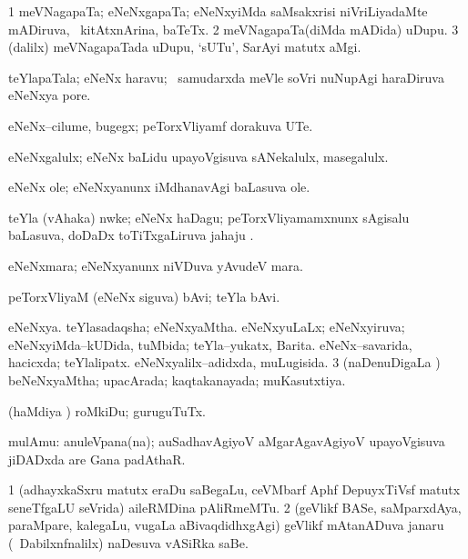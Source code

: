 \bentry
{}
\gl{\nA}
\bmng
\bnum
\num{1} meVNagapaTa; eNeNxgapaTa; eNeNxyiMda saMsakxrisi niVriLiyadaMte mADiruva, \kanmu\ kitAtxnArina, baTeTx. 
\num{2} meVNagapaTa(diMda mADida) uDupu. 
\num{3} (\bava dalilx) meVNagapaTada uDupu, `sUTu', SarAyi matutx aMgi. 
\enum
\emng
\eentry

\bentry
{}
\gl{\nA}
\bmng
teYlapaTala; eNeNx haravu; \kanmu\ samudarxda meVle soVri nuNupAgi haraDiruva eNeNxya pore. 
\emng
\eentry

\bentry
{}
\gl{\nA}
\bmng
eNeNx--cilume, bugegx; peTorxVliyamf dorakuva UTe. 
\emng
\eentry

\bentry
{}
\gl{\nA}
\bmng
eNeNxgalulx; eNeNx baLidu upayoVgisuva sANekalulx, masegalulx. 
\emng
\eentry

\bentry
{}
\gl{\nA}
\bmng
eNeNx ole; eNeNxyanunx iMdhanavAgi baLasuva ole. 
\emng
\eentry

\bentry
{}
\gl{\nA}
\bmng
teYla (vAhaka) nwke; eNeNx haDagu; peTorxVliyamamxnunx sAgisalu baLasuva, doDaDx toTiTxgaLiruva ja{ha}ju . 
\emng
\eentry

\bentry
{}
\gl{\nA}
\bmng
eNeNxmara; eNeNxyanunx niVDuva yAvudeV mara. 
\emng
\eentry

\bentry
{}
\gl{\nA}
\bmng
peTorxVliyaM (eNeNx siguva) bAvi; teYla bAvi. 
\emng
\eentry

\bentry
{}
\gl{\gu}
\bmng
\bnum
{} 
\banum
{} eNeNxya. 
 teYlasadaqsha; eNeNxyaMtha. 
 eNeNxyuLaLx; eNeNxyiruva; eNeNxyiMda--kUDida, tuMbida; teYla--yukatx, Barita. 
\eanum
\numie
{} 
\banum
{} eNeNx--savarida, hacicxda; teYlalipatx. 
 eNeNxyalilx--adidxda, muLugisida. 
\eanum
\numie
\num{3} (naDenuDigaLa \vi) beNeNxyaMtha; upacArada; kaqtakanayada; muKasutxtiya. 
\enum
\emng
\eentry

\bentry
{}
\gl{\akirx}
\bmng
(haMdiya \vi) roMkiDu; guruguTuTx. 
\emng
\eentry

\bentry
{}
\gl{\nA}
\bmng
mulAmu: anuleVpana(na); auSadhavAgiyoV aMgarAgavAgiyoV upayoVgisuva jiDADxda are Gana padAthaR. 
\emng
\eentry

\bentry
{}
\gl{\nA}
\bmng
\bnum
\num{1} (adhayxkaSxru matutx eraDu saBegaLu, ceVMbarf Aphf DepuyxTiVsf matutx seneTfgaLU seVrida) aileRMDina pAliRmeMTu. 
\num{2} (geVlikf BASe, saMparxdAya, paraMpare, kalegaLu, \mo vugaLa aBivaqdidhxgAgi) geVlikf mAtanADuva janaru (\sA\ Dabilxnfnalilx) naDesuva vASiRka saBe. 
\enum
\emng
\eentry

